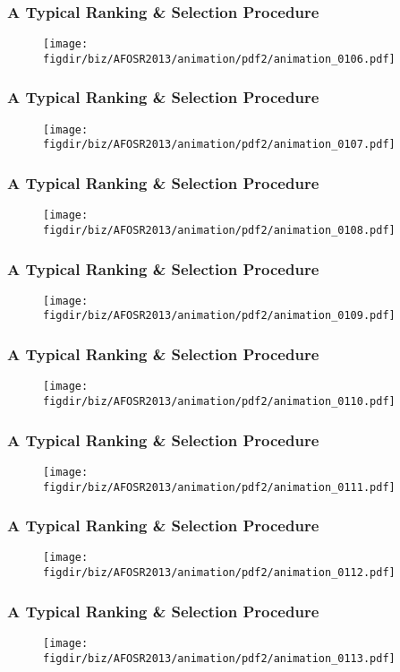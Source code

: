 \documentclass[13pt]{beamer}
\newcommand{\figdir}{../../fig}
\begin{document}
\begin{frame}\frametitle{A Typical Ranking \& Selection Procedure}\begin{figure}\texttt{[image: \\figdir/biz/AFOSR2013/animation/pdf2/animation\_0106.pdf]}\end{figure}\end{frame}
\begin{frame}\frametitle{A Typical Ranking \& Selection Procedure}\begin{figure}\texttt{[image: \\figdir/biz/AFOSR2013/animation/pdf2/animation\_0107.pdf]}\end{figure}\end{frame}
\begin{frame}\frametitle{A Typical Ranking \& Selection Procedure}\begin{figure}\texttt{[image: \\figdir/biz/AFOSR2013/animation/pdf2/animation\_0108.pdf]}\end{figure}\end{frame}
\begin{frame}\frametitle{A Typical Ranking \& Selection Procedure}\begin{figure}\texttt{[image: \\figdir/biz/AFOSR2013/animation/pdf2/animation\_0109.pdf]}\end{figure}\end{frame}
\begin{frame}\frametitle{A Typical Ranking \& Selection Procedure}\begin{figure}\texttt{[image: \\figdir/biz/AFOSR2013/animation/pdf2/animation\_0110.pdf]}\end{figure}\end{frame}
\begin{frame}\frametitle{A Typical Ranking \& Selection Procedure}\begin{figure}\texttt{[image: \\figdir/biz/AFOSR2013/animation/pdf2/animation\_0111.pdf]}\end{figure}\end{frame}
\begin{frame}\frametitle{A Typical Ranking \& Selection Procedure}\begin{figure}\texttt{[image: \\figdir/biz/AFOSR2013/animation/pdf2/animation\_0112.pdf]}\end{figure}\end{frame}
\begin{frame}\frametitle{A Typical Ranking \& Selection Procedure}\begin{figure}\texttt{[image: \\figdir/biz/AFOSR2013/animation/pdf2/animation\_0113.pdf]}\end{figure}\end{frame}
\end{document}
